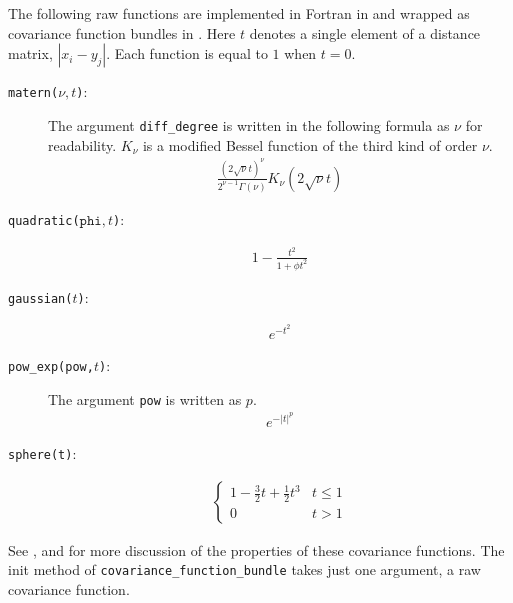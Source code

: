 \documentclass{manual}
\begin{document}
The following raw functions are implemented in Fortran in  and wrapped as covariance function bundles in . Here $t$ denotes a single element of a distance matrix, $|x_i-y_j|$. Each function is equal to $1$ when $t=0$.
\begin{description}
    \item[\texttt{matern($\nu,t$)}:] The argument \texttt{diff_degree} is written in the following formula as $\nu$ for readability. $K_\nu$ is a modified Bessel function of the third kind of order $\nu$.
    \begin{eqnarray*}
        \frac{(2\sqrt{\nu}t)^\nu}{2^{\nu-1}\Gamma(\nu)}K_\nu(2\sqrt{\nu}t)
    \end{eqnarray*}
    \item[\texttt{quadratic($\texttt{phi},t$)}:]
    \begin{eqnarray*}
        1-\frac{t^2}{1+\phi t^2}
    \end{eqnarray*}
    \item[\texttt{gaussian($t$)}:]
    \begin{eqnarray*}
        e^{-t^2}
    \end{eqnarray*}
    \item[\texttt{pow_exp(\texttt{pow},$t$)}:] The argument \texttt{pow} is written as $p$.
    \begin{eqnarray*}
        e^{-|t|^p}
    \end{eqnarray*}
    \item[\texttt{sphere(t)}:]
    \begin{eqnarray}
        \left\{
        \begin{array}{ll}
            1-\frac{3}{2}t+\frac{1}{2}t^3& t\le 1\\
            0 & t > 1
        \end{array} \right.
    \end{eqnarray}
\end{description}

See  \cite{banerjee} ,  \cite{diggle} and  \cite{stein}for more discussion of the properties of these covariance functions. The init method of \texttt{covariance_function_bundle} takes just one argument, a raw covariance function.
\end{document}
